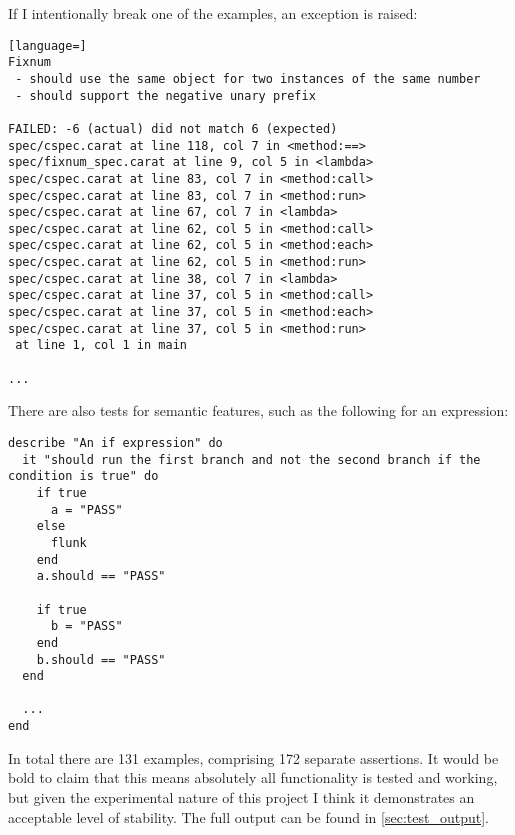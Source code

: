 If I intentionally break one of the examples, an exception is raised:

\begin{lstlisting}[language=]
Fixnum
 - should use the same object for two instances of the same number
 - should support the negative unary prefix

FAILED: -6 (actual) did not match 6 (expected)
spec/cspec.carat at line 118, col 7 in <method:==>
spec/fixnum_spec.carat at line 9, col 5 in <lambda>
spec/cspec.carat at line 83, col 7 in <method:call>
spec/cspec.carat at line 83, col 7 in <method:run>
spec/cspec.carat at line 67, col 7 in <lambda>
spec/cspec.carat at line 62, col 5 in <method:call>
spec/cspec.carat at line 62, col 5 in <method:each>
spec/cspec.carat at line 62, col 5 in <method:run>
spec/cspec.carat at line 38, col 7 in <lambda>
spec/cspec.carat at line 37, col 5 in <method:call>
spec/cspec.carat at line 37, col 5 in <method:each>
spec/cspec.carat at line 37, col 5 in <method:run>
 at line 1, col 1 in main

...
\end{lstlisting}

\newpage
There are also tests for semantic features, such as the following for an  expression:

\begin{lstlisting}
describe "An if expression" do
  it "should run the first branch and not the second branch if the condition is true" do
    if true
      a = "PASS"
    else
      flunk
    end
    a.should == "PASS"
    
    if true
      b = "PASS"
    end
    b.should == "PASS"
  end
  
  ...
end
\end{lstlisting}

In total there are 131 examples, comprising 172 separate assertions. It would be bold to claim that this means absolutely all functionality is tested and working, but given the experimental nature of this project I think it demonstrates an acceptable level of stability. The full output can be found in \autoref{sec:test_output}.

